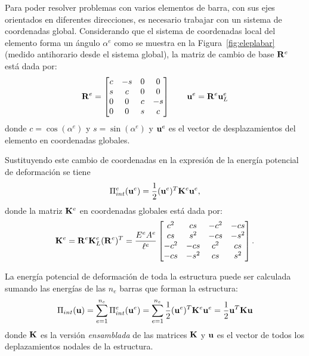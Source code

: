 Para poder resolver problemas con varios elementos de barra, con sus ejes orientados en diferentes direcciones, es necesario trabajar con un sistema de coordenadas global. %
%
Considerando que el sistema de coordenadas local del elemento forma un ángulo $\alpha^e$ como se muestra en la Figura~\ref{fig:eleplabar} (medido antihorario desde el sistema global), la matriz de cambio de base ${\bf R}^e$ está dada por:
%
\begin{equation}\label{eqn:rotabarra}
{\bf R}^e = 
\left[
\begin{matrix}
c & -s & 0 & 0 \\
s & c & 0 & 0\\
0 & 0 &  c & -s\\
0 & 0 & s & c
\end{matrix}
\right]
\qquad
{\bf u}^e = {\bf R}^e {\bf u}^e_L
\end{equation}
%
donde $c=\cos(\alpha^e)$ y $s=\sin(\alpha^e)$ y ${\bf u}^e$ es el vector de desplazamientos del elemento en coordenadas globales. %
%


Sustituyendo este cambio de coordenadas en la expresión de la energía potencial de deformación se tiene
\begin{equation}
\Pi_{int}^e({\bf u}^e) = \frac{1}{2} ({\bf u}^e)^T {\bf K}^e {\bf u}^e,
\end{equation}
%
donde la matriz ${\bf K}^e$ en coordenadas globales está dada por:
%
\begin{equation}
{\bf K}^e = {\bf R}^e {\bf K}^e_L ({\bf R}^e)^T
= 
\frac{E^e A^e}{\ell^e}
\left[
\begin{matrix}
c^2 & cs & -c^2 & -cs \\
cs & s^2 & -cs & -s^2\\
-c^2 & -cs &  c^2 & cs\\
-cs & -s^2 & cs & s^2
\end{matrix}
\right].
\end{equation}




La energía potencial de deformación de toda la estructura puede ser calculada sumando las energías de las $n_e$ barras que forman la estructura:
%
\begin{equation}\label{eqn:matU}
  \Pi_{int}({\bf u}) = \sum_{e=1}^{n_e} \Pi_{int}^e({\bf u}^e) = 
   \sum_{e=1}^{n_e} \frac{1}{2} ({\bf u}^e)^T {\bf K}^e {\bf u}^e 
= \frac{1}{2} {\bf u}^T {\bf K} {\bf u}
\end{equation}
%
donde ${\bf K}$ es la versión \textit{ensamblada} de las matrices ${\bf K}$ y ${\bf u}$ es el vector de todos los deplazamientos nodales de la estructura.




